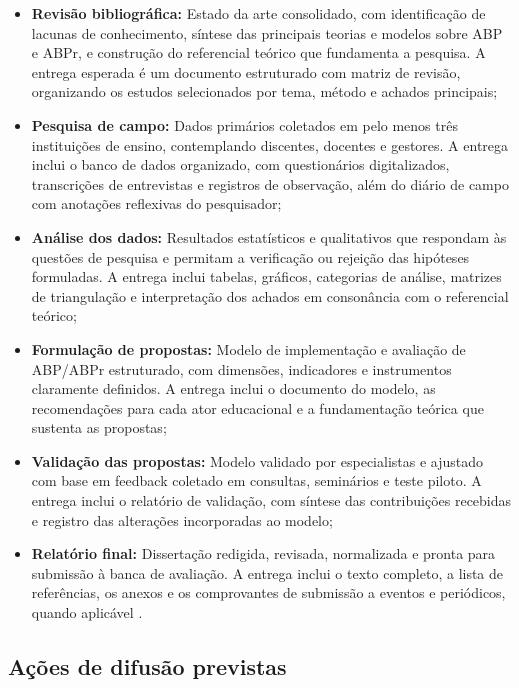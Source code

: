 \begin{itemize}
    \item \textbf{Revisão bibliográfica:} Estado da arte consolidado, com identificação de lacunas de conhecimento, síntese das principais teorias e modelos sobre ABP e ABPr, e construção do referencial teórico que fundamenta a pesquisa. A entrega esperada é um documento estruturado com matriz de revisão, organizando os estudos selecionados por tema, método e achados principais;
    \item \textbf{Pesquisa de campo:} Dados primários coletados em pelo menos três instituições de ensino, contemplando discentes, docentes e gestores. A entrega inclui o banco de dados organizado, com questionários digitalizados, transcrições de entrevistas e registros de observação, além do diário de campo com anotações reflexivas do pesquisador;
    \item \textbf{Análise dos dados:} Resultados estatísticos e qualitativos que respondam às questões de pesquisa e permitam a verificação ou rejeição das hipóteses formuladas. A entrega inclui tabelas, gráficos, categorias de análise, matrizes de triangulação e interpretação dos achados em consonância com o referencial teórico;
    \item \textbf{Formulação de propostas:} Modelo de implementação e avaliação de ABP/ABPr estruturado, com dimensões, indicadores e instrumentos claramente definidos. A entrega inclui o documento do modelo, as recomendações para cada ator educacional e a fundamentação teórica que sustenta as propostas;
    \item \textbf{Validação das propostas:} Modelo validado por especialistas e ajustado com base em feedback coletado em consultas, seminários e teste piloto. A entrega inclui o relatório de validação, com síntese das contribuições recebidas e registro das alterações incorporadas ao modelo;
    \item \textbf{Relatório final:} Dissertação redigida, revisada, normalizada e pronta para submissão à banca de avaliação. A entrega inclui o texto completo, a lista de referências, os anexos e os comprovantes de submissão a eventos e periódicos, quando aplicável \cite{CRESWELL2018}.
\end{itemize}

\subsection{Ações de difusão previstas}
\label{subsec:acoes_difusao}

